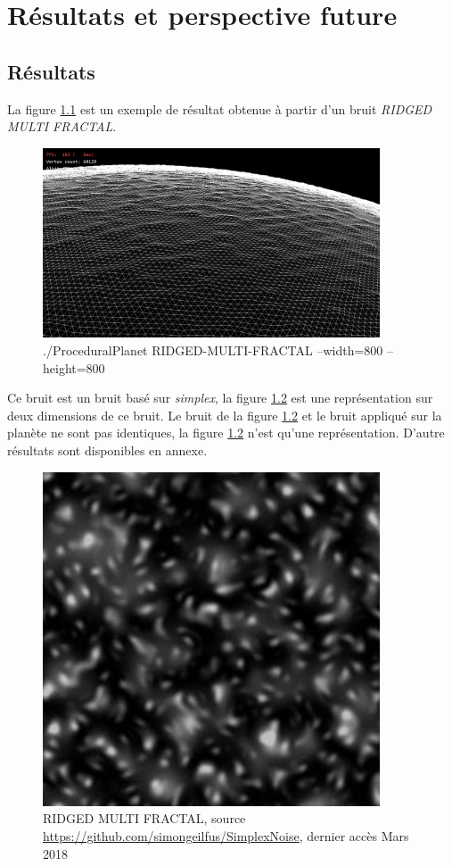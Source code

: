 \chapter{Résultats et perspective future}

\section{Résultats}

La figure \ref{fig:rmf_800} est un exemple de résultat obtenue à partir d'un bruit \textit{RIDGED MULTI FRACTAL}. 

\begin{figure}
    \centering
    \includegraphics[width=10cm]{img/RMFV_w800_h800_wire_0.png}
    \caption{./ProceduralPlanet RIDGED-MULTI-FRACTAL --width=800 --height=800}
    \label{fig:rmf_800}
\end{figure}

Ce bruit est un bruit basé sur \textit{simplex}, la figure \ref{fig:rmf} est une représentation sur deux dimensions de ce bruit.
Le bruit de la figure \ref{fig:rmf} et le bruit appliqué sur la planète ne sont pas identiques, la figure \ref{fig:rmf} n'est qu'une représentation.
D'autre résultats sont disponibles en annexe.

\begin{figure}
    \centering
    \includegraphics[width=10cm]{img/RMF.jpg}
    \caption{RIDGED MULTI FRACTAL, source \url{https://github.com/simongeilfus/SimplexNoise}, dernier accès Mars 2018}
    \label{fig:rmf}
\end{figure}

